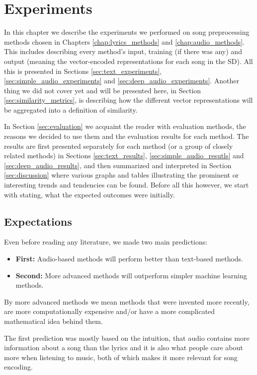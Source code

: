 \chapter{Experiments}\label{chap:experiments}

In this chapter we describe the experiments we performed on song preprocessing methods chosen in Chapters \ref{chap:lyrics_methods} and \ref{chap:audio_methods}. This includes describing every method's input, training (if there was any) and output (meaning the vector-encoded representations for each song in the SD). All this is presented in Sections \ref{sec:text_experiments}, \ref{sec:simple_audio_experiments} and \ref{sec:deep_audio_experiments}. Another thing we did not cover yet and will be presented here, in Section \ref{sec:similarity_metrics}, is describing how the different vector representations will be aggregated into a definition of similarity.

In Section \ref{sec:evaluation} we acquaint the reader with evaluation methods, the reasons we decided to use them and the evaluation results for each method. The results are first presented separately for each method (or a group of closely related methods) in Sections \ref{sec:text_results}, \ref{sec:simple_audio_resutls} and \ref{sec:deep_audio_results}, and then summarized and interpreted in Section \ref{sec:discussion} where various graphs and tables illustrating the prominent or interesting trends and tendencies can be found. Before all this however, we start with stating, what the expected outcomes were initially.

\section{Expectations}\label{sec:expectations}

Even before reading any literature, we made two main predictions: 
\begin{itemize}
    \item \textbf{First:} Audio-based methods will perform better than text-based methods.
    \item \textbf{Second:} More advanced methods will outperform simpler machine learning methods.
\end{itemize} 
By more advanced methods we mean methods that were invented more recently, are more computationally expensive and/or have a more complicated mathematical idea behind them. 

The first prediction was mostly based on the intuition, that audio contains more information about a song than the lyrics and it is also what people care about more when listening to music, both of which makes it more relevant for song encoding. 

